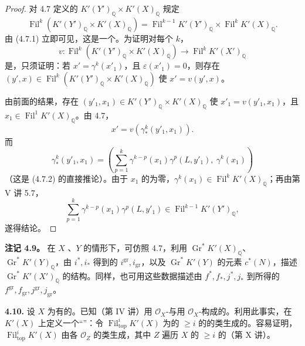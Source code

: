 \begin{proof}
对 4.7 定义的 $K'(Y')_{\mathbb Q}\times K'(X)_{\mathbb Q}$ 规定
\[
\operatorname{Fil}^k(K'(Y')_{\mathbb Q}\times K'(X)_{\mathbb Q})
=\operatorname{Fil}^{k-1}K'(Y')_{\mathbb Q}\times\operatorname{Fil}^kK'(X)_{\mathbb Q}.
\]
由 (4.7.1) 立即可见，这是一个。为证明对每个 $k$，
\[
v:\operatorname{Fil}^k(K'(Y')_{\mathbb Q}\times K'(X)_{\mathbb Q})
\longrightarrow\operatorname{Fil}^kK'(X')_{\mathbb Q}
\]
是，只须证明：若 $x'=\gamma^k(x'_1)$，且 $\varepsilon(x'_1)=0$，则存在 $(y',x)\in\operatorname{Fil}^k(K'(Y')_{\mathbb Q}\times K'(X)_{\mathbb Q})$ 使 $x'=v(y',x)$。

由前面的结果，存在 $(y'_1,x_1)\in K'(Y')_{\mathbb Q}\times K'(X)_{\mathbb Q}$ 使 $x'_1=v(y'_1,x_1)$，且 $x_1\in\operatorname{Fil}^1K'(X)_{\mathbb Q}$。由 4.7，
\[
x'=v(\gamma_*^k(y'_1,x_1)).
\]
而
\[
\gamma_*^k(y'_1,x_1)
=\left(\sum_{p=1}^k\gamma^{k-p}(x_1)\gamma^p(L,y'_1),\ \gamma^k(x_1)\right)
\]
（这是 (4.7.2) 的直接推论）。由于 $x_1$ 的为零，$\gamma^k(x_1)\in\operatorname{Fil}^kK'(X)_{\mathbb Q}$；再由第 V 讲 5.7，
\[
\sum_{p=1}^k\gamma^{k-p}(x_1)\gamma^p(L,y'_1)\in\operatorname{Fil}^{k-1}K'(Y')_{\mathbb Q},
\]
遂得结论。
\end{proof}

\textbf{注记 4.9。} 在 $X$ 、$Y$ 的情形下，可仿照 4.7，利用 $\operatorname{Gr}^*K'(X)_{\mathbb Q}$、$\operatorname{Gr}^*K'(Y)_{\mathbb Q}$，由 $i^*,i_*$ 得到的 $i^{\mathrm{gr}},i_{\mathrm{gr}}$，以及 $\operatorname{Gr}^*K'(Y)$ 的元素 $c^*(N)$，描述 $\operatorname{Gr}^*K'(X')_{\mathbb Q}$ 的结构。同样，也可用这些数据描述由 $f^*,f_*,j^*,j_*$ 到所得的 $f^{\mathrm{gr}},f_{\mathrm{gr}},j^{\mathrm{gr}},j_{\mathrm{gr}}$。

\textbf{4.10.} 设 $X$ 为有的。已知（第 IV 讲）用 $\mathcal O_X$-与用 $\mathcal O_X$-构成的。利用此事实，在 $K'(X)$ 上定义一个“”：令 $\operatorname{Fil}_{\mathrm{top}}^iK'(X)$ 为的 $\geq i$ 的的类生成的。容易证明，$\operatorname{Fil}_{\mathrm{top}}^iK'(X)$ 由各 $\mathcal O_Z$ 的类生成，其中 $Z$ 遍历 $X$ 的 $\geq i$ 的（第 X 讲）。

